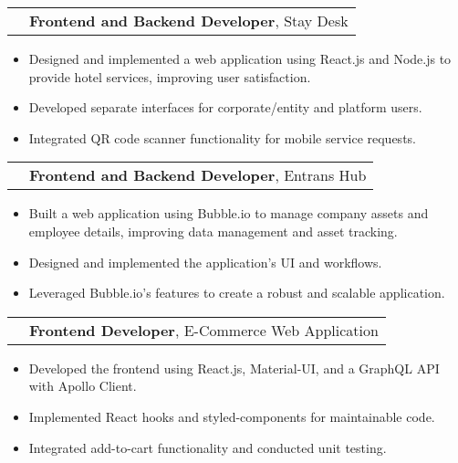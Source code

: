 \documentclass{article}
\newenvironment{onecolentry}{\begin{itemize}[leftmargin=*,noitemsep,topsep=0pt,parsep=0pt,partopsep=0pt]}{\end{itemize}}
\newenvironment{twocolentry}[1]{\begin{tabularx}{\textwidth}{lX}#1 & }{\end{tabularx}\vspace{0.1cm}}
\newenvironment{highlights}{\begin{itemize}[leftmargin=*,noitemsep,topsep=0pt,parsep=0pt,partopsep=0pt,label=\textbullet]}{\end{itemize}}
\begin{document}
\begin{twocolentry}{
}
    \textbf{Frontend and Backend Developer}, Stay Desk
\end{twocolentry}
\begin{onecolentry}
    \begin{highlights}
        \item Designed and implemented a web application using React.js and Node.js to provide hotel services, improving user satisfaction.
        \item Developed separate interfaces for corporate/entity and platform users.
        \item Integrated QR code scanner functionality for mobile service requests.
    \end{highlights}
\end{onecolentry}

\begin{twocolentry}{
}
    \textbf{Frontend and Backend Developer}, Entrans Hub
\end{twocolentry}
\begin{onecolentry}
    \begin{highlights}
        \item Built a web application using Bubble.io to manage company assets and employee details, improving data management and asset tracking.
        \item Designed and implemented the application's UI and workflows.
        \item Leveraged Bubble.io's features to create a robust and scalable application.
    \end{highlights}
\end{onecolentry}

\begin{twocolentry}{
}
    \textbf{Frontend Developer}, E-Commerce Web Application
\end{twocolentry}
\begin{onecolentry}
    \begin{highlights}
        \item Developed the frontend using React.js, Material-UI, and a GraphQL API with Apollo Client.
        \item Implemented React hooks and styled-components for maintainable code.
        \item Integrated add-to-cart functionality and conducted unit testing.
    \end{highlights}
\end{onecolentry}
\end{document}
